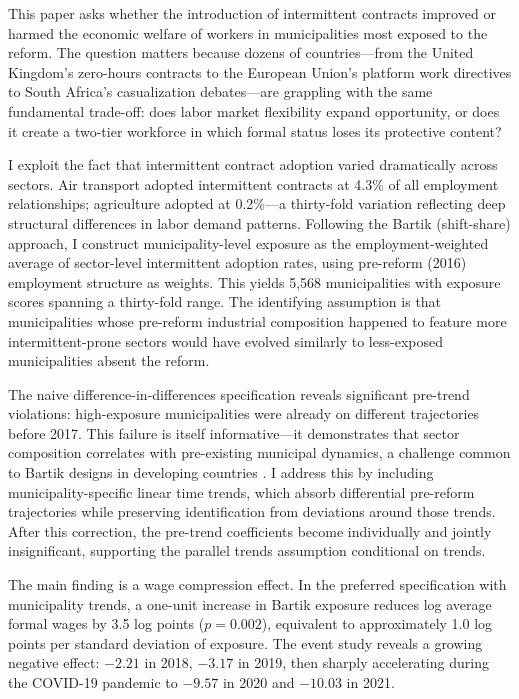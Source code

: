 \documentclass[12pt]{article}
\begin{document}
This paper asks whether the introduction of intermittent contracts improved or harmed the economic welfare of workers in municipalities most exposed to the reform. The question matters because dozens of countries---from the United Kingdom's zero-hours contracts to the European Union's platform work directives to South Africa's casualization debates---are grappling with the same fundamental trade-off: does labor market flexibility expand opportunity, or does it create a two-tier workforce in which formal status loses its protective content?

I exploit the fact that intermittent contract adoption varied dramatically across sectors. Air transport adopted intermittent contracts at 4.3\% of all employment relationships; agriculture adopted at 0.2\%---a thirty-fold variation reflecting deep structural differences in labor demand patterns. Following the Bartik (shift-share) approach, I construct municipality-level exposure as the employment-weighted average of sector-level intermittent adoption rates, using pre-reform (2016) employment structure as weights. This yields 5,568 municipalities with exposure scores spanning a thirty-fold range. The identifying assumption is that municipalities whose pre-reform industrial composition happened to feature more intermittent-prone sectors would have evolved similarly to less-exposed municipalities absent the reform.

The naive difference-in-differences specification reveals significant pre-trend violations: high-exposure municipalities were already on different trajectories before 2017. This failure is itself informative---it demonstrates that sector composition correlates with pre-existing municipal dynamics, a challenge common to Bartik designs in developing countries \citep{GoldsmithPinkham2020}. I address this by including municipality-specific linear time trends, which absorb differential pre-reform trajectories while preserving identification from deviations around those trends. After this correction, the pre-trend coefficients become individually and jointly insignificant, supporting the parallel trends assumption conditional on trends.

The main finding is a wage compression effect. In the preferred specification with municipality trends, a one-unit increase in Bartik exposure reduces log average formal wages by 3.5 log points ($p = 0.002$), equivalent to approximately 1.0 log points per standard deviation of exposure. The event study reveals a growing negative effect: $-2.21$ in 2018, $-3.17$ in 2019, then sharply accelerating during the COVID-19 pandemic to $-9.57$ in 2020 and $-10.03$ in 2021.
\end{document}
